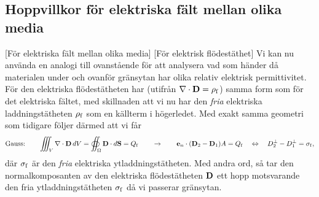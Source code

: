 {{{{{\subsection{Hoppvillkor f{\"o}r elektriska f{\"a}lt mellan olika media}
[F{\"o}r elektriska f{\"a}lt mellan olika media]
[F{\"o}r elektrisk fl{\"o}dest{\"a}thet]
Vi kan nu anv{\"a}nda en analogi till ovanst{\aa}ende f{\"o}r att analysera vad
som h{\"a}nder d{\aa} materialen under och ovanf{\"o}r gr{\"a}nsytan har olika
relativ elektrisk permittivitet. 
F{\"o}r den elektriska fl{\"o}dest{\"a}theten har  (utifr{\aa}n
$\nabla\cdot{\bf D}=\rho_{\rm f}$) samma form som f{\"o}r det elektriska
f{\"a}ltet, med skillnaden att vi nu har den {\it fria} elektriska
laddningst{\"a}theten $\rho_{\rm f}$ som en k{\"a}llterm i h{\"o}gerledet.
Med exakt samma geometri som tidigare f{\"o}ljer d{\"a}rmed att vi
f{\aa}r
$$
  \hbox{Gauss:}\qquad
  \displaystyle
  \iiint_V\nabla\cdot{\bf D}\,dV=
  \oiint_{\Omega}{\bf D}\cdot d{\bf S} = Q_{\rm f}
  \qquad\to\qquad
  {\bf e}_n \cdot({\bf D}_{2}-{\bf D}_{1})A = Q_{\rm f}
  \quad\Leftrightarrow\quad
  D^{\perp}_{2}-D^{\perp}_{1} = \sigma_{\rm f},
$$
d{\"a}r $\sigma_{\rm f}$ {\"a}r den {\it fria} elektriska
ytladdningst{\"a}theten. Med andra ord, s{\aa} tar den normalkomposanten av
den elektriska fl{\"o}dest{\"a}theten ${\bf D}$ ett hopp motsvarande den fria
ytladdningst{\"a}theten $\sigma_{\rm f}$ d{\aa} vi passerar gr{\"a}nsytan.

}}}}}
